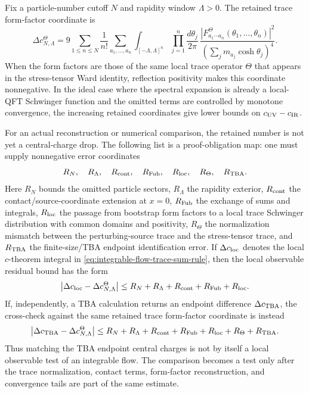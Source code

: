 \begin{remark}
\label{rem:trace-form-factor-c-sum-proof-obligation-map}
Fix a particle-number cutoff \(N\) and rapidity window \(\Lambda>0\).  The
retained trace form-factor coordinate is
\[
  \Delta c_{N,\Lambda}^{\Theta}
  =
  9
  \sum_{1\leq n\leq N}\frac1{n!}
  \sum_{a_1,\ldots,a_n}
  \int_{[-\Lambda,\Lambda]^n}
  \prod_{j=1}^n\frac{d\theta_j}{2\pi}\,
  \frac{
  \left|F^{\Theta}_{a_1\cdots a_n}(\theta_1,\ldots,\theta_n)\right|^2}
  {\left(\sum_j m_{a_j}\cosh\theta_j\right)^4}.
\]
When the form factors are those of the same local trace operator
\(\Theta\) that appears in the stress-tensor Ward identity, reflection
positivity makes this coordinate nonnegative.  In the ideal case where the
spectral expansion is already a local-QFT Schwinger function and the omitted
terms are controlled by monotone convergence, the increasing retained
coordinates give lower bounds on \(c_{\rm UV}-c_{\rm IR}\).

For an actual reconstruction or numerical comparison, the retained number is
not yet a central-charge drop.  The following list is a proof-obligation map:
one must supply nonnegative error coordinates
\[
  R_N,\quad R_\Lambda,\quad R_{\rm cont},\quad
  R_{\rm Fub},\quad R_{\rm loc},\quad R_\Theta,\quad R_{\rm TBA}.
\]
Here \(R_N\) bounds the omitted particle sectors, \(R_\Lambda\) the rapidity
exterior, \(R_{\rm cont}\) the contact/source-coordinate extension at
\(x=0\), \(R_{\rm Fub}\) the exchange of sums and integrals, \(R_{\rm loc}\)
the passage from bootstrap form factors to a local trace Schwinger
distribution with common domains and positivity, \(R_\Theta\) the
normalization mismatch between the perturbing-source trace and the
stress-tensor trace, and \(R_{\rm TBA}\) the finite-size/TBA endpoint
identification error.  If
\(\Delta c_{\rm loc}\) denotes the local \(c\)-theorem integral in
\eqref{eq:integrable-flow-trace-sum-rule}, then the local observable
residual bound has the form
\[
  \left|
  \Delta c_{\rm loc}-\Delta c_{N,\Lambda}^{\Theta}
  \right|
  \leq
  R_N+R_\Lambda+R_{\rm cont}+R_{\rm Fub}+R_{\rm loc}.
\]
If, independently, a TBA calculation returns an endpoint difference
\(\Delta c_{\rm TBA}\), the cross-check against the same retained trace
form-factor coordinate is instead
\[
  \left|
  \Delta c_{\rm TBA}-\Delta c_{N,\Lambda}^{\Theta}
  \right|
  \leq
  R_N+R_\Lambda+R_{\rm cont}+R_{\rm Fub}
  +R_{\rm loc}+R_\Theta+R_{\rm TBA}.
\]
Thus matching the TBA endpoint central charges is not by itself a local
observable test of an integrable flow.  The comparison becomes a test only
after the trace normalization, contact terms, form-factor reconstruction,
and convergence tails are part of the same estimate.
\end{remark}

